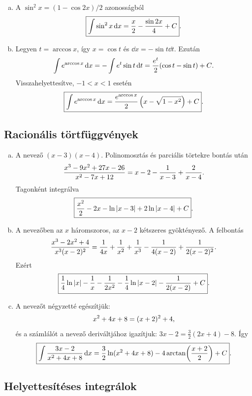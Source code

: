 \documentclass{szb-solution}
\begin{document}
\begin{enumerate}[a)]
  \item A $\sin^2x=(1-\cos2x)/2$ azonosságból
        $$
          \boxed{\int\sin^2x\mathop{}\!\mathrm{d} x=\frac{x}{2}-\frac{\sin2x}{4}+C}
          \text.
        $$

  \item Legyen $t=\arccos x$, így $x=\cos t$ és
        $\dd x=-\sin t\dd t$. Ezután
        $$
          \int e^{\arccos x}\mathop{}\!\mathrm{d} x=-\int e^t\sin t\mathop{}\!\mathrm{d} t
          =\frac{e^t}{2}(\cos t-\sin t)+C
          \text.
        $$
        Visszahelyettesítve, $-1<x<1$ esetén
        $$
          \boxed{\int e^{\arccos x}\mathop{}\!\mathrm{d} x
          =\frac{e^{\arccos x}}{2}
          \left(x-\sqrt{1-x^2}\right)+C}
          \text.
        $$
\end{enumerate}

\subsection{Racionális törtfüggvények}

\begin{enumerate}[a)]
  \item A nevező $(x-3)(x-4)$. Polinomosztás és parciális törtekre bontás
        után
        $$
          \frac{x^3-9x^2+27x-26}{x^2-7x+12}
          =x-2-\frac1{x-3}+\frac2{x-4}
          \text.
        $$
        Tagonként integrálva
        $$
          \boxed{\frac{x^2}{2}-2x-\ln|x-3|+2\ln|x-4|+C}
          \text.
        $$

  \item A nevezőben az $x$ háromszoros, az $x-2$ kétszeres gyöktényező.
        A felbontás
        $$
          \frac{x^3-2x^2+4}{x^3(x-2)^2}
          =\frac1{4x}+\frac1{x^2}+\frac1{x^3}
           -\frac1{4(x-2)}+\frac1{2(x-2)^2}
          \text.
        $$
        Ezért
        $$
          \boxed{\frac14\ln|x|-\frac1x-\frac1{2x^2}
          -\frac14\ln|x-2|-\frac1{2(x-2)}+C}
          \text.
        $$

  \item A nevezőt négyzetté egészítjük:
        $$
          x^2+4x+8=(x+2)^2+4
          \text,
        $$
        és a számlálót a nevező deriváltjához igazítjuk:
        $3x-2=\tfrac32(2x+4)-8$. Így
        $$
          \boxed{\int\frac{3x-2}{x^2+4x+8}\mathop{}\!\mathrm{d} x
          =\frac32\ln(x^2+4x+8)
          -4\arctan\!\left(\frac{x+2}{2}\right)+C}
          \text.
        $$
\end{enumerate}

\subsection{Helyettesítéses integrálok}
\end{document}
